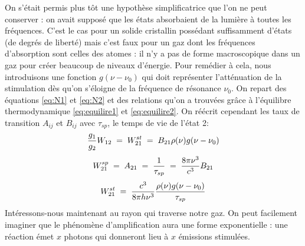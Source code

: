 On s'était permis plus tôt une hypothèse simplificatrice que l'on ne peut conserver : on avait supposé que les états absorbaient de la lumière à toutes les fréquences. C'est le cas pour un solide cristallin possédant suffisamment d'états (de degrés de liberté) mais c'est faux pour un gaz dont les fréquences d'absorption sont celles des atomes : il n'y a pas de forme macroscopique dans un gaz pour créer beaucoup de niveaux d'énergie. Pour remédier à cela, nous introduisons une fonction $g(\nu - \nu_0)$ qui doit représenter l'atténuation de la stimulation dès qu'on s'éloigne de la fréquence de résonance $\nu_0$. On repart des équations \ref{eq:N1} et \ref{eq:N2} et des relations qu'on a trouvées grâce à l'équilibre thermodynamique \ref{eq:equilire1} et \ref{eq:equilire2}. On réécrit cependant les taux de transition $A_{ij}$ et $B_{ij}$ avec $\tau_{sp}$, le temps de vie de l'état 2:
\[
    \dfrac{g_1}{g_2}W_{12} \; = \; W_{21}^{st} \; = \; B_{21} \rho(\nu) g(\nu - \nu_0)
\]
\[
    W_{21}^{sp} \; = \; A_{21} \; = \; \dfrac{1}{\tau_{sp}} \; = \; \dfrac{8\pi \nu^3}{c^3}B_{21}
\]
\[
    W_{21}^{st} \; = \; \dfrac{c^3}{8\pi h \nu^3}\dfrac{\rho(\nu) g(\nu - \nu_0)}{\tau_{sp}}
\]
Intéressons-nous maintenant au rayon qui traverse notre gaz. On peut facilement imaginer que le phénomène d'amplification aura une forme exponentielle : une réaction émet $x$ photons qui donneront lieu à $x$ émissions stimulées.\\

